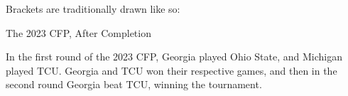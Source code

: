 {Brackets are traditionally drawn like so:


 {The 2023 CFP, After Completion}

In the first round of the 2023 CFP, Georgia played Ohio State, and Michigan played TCU. Georgia and TCU won their respective games, and then in the second round Georgia beat TCU, winning the tournament.


}